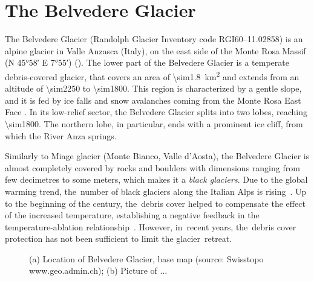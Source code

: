 
\section{The Belvedere Glacier}

The Belvedere Glacier (Randolph Glacier Inventory code RGI60--11.02858) is an alpine
glacier in Valle Anzasca (Italy), on the east side of the Monte Rosa Massif (N
\ang{45;58} E \ang{7;55}) ().
The lower part of the Belvedere Glacier is a temperate debris-covered glacier, that
covers an area of
\SI{\sim1.8}{\kilo\meter\squared} and extends from an altitude of \SI{\sim2250}{\masl} to
\SI{\sim1800}{\masl}.
This region is characterized by a gentle slope, and it is fed by ice falls and snow
avalanches coming from the Monte Rosa East Face \citep{Haeberli2002}. In its low-relief
sector, the Belvedere Glacier splits into two lobes, reaching \SI{\sim1800}{\masl}.
The northern lobe, in particular, ends with a prominent ice cliff, from which the River
Anza springs.

Similarly to Miage glacier (Monte Bianco, Valle d’Aosta), the Belvedere Glacier is almost
completely covered by rocks and boulders with dimensions ranging from few decimetres to
some meters, which makes it a \textit{black glaciers}.
Due to the global warming trend, the~number of black glaciers along the Italian Alps is
rising~\citep{Diolaiuti2003}.
Up to the beginning of the century, the~debris cover helped to compensate the effect of
the increased temperature, establishing a negative feedback in the temperature-ablation
relationship~\citep{Roethlisberger1985,Diolaiuti2003}.
However, in~recent years, the~debris cover protection has not been sufficient to limit
the glacier~retreat.

\begin{figure}
    \centering
    \caption{(a) Location of Belvedere Glacier, base map (source: Swisstopo
        www.geo.admin.ch); (b) Picture of ...}
    \label{fig:1:studyarea}
\end{figure}

